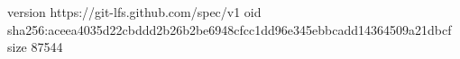 version https://git-lfs.github.com/spec/v1
oid sha256:aceea4035d22cbddd2b26b2be6948cfcc1dd96e345ebbcadd14364509a21dbcf
size 87544

